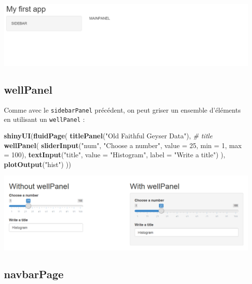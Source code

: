 \documentclass[
]{article}
\newenvironment{Shaded}{\begin{snugshade}}{\end{snugshade}}
\newcommand{\AttributeTok}[1]{\textcolor[rgb]{0.13,0.29,0.53}{#1}}
\newcommand{\CommentTok}[1]{\textcolor[rgb]{0.56,0.35,0.01}{\textit{#1}}}
\newcommand{\DecValTok}[1]{\textcolor[rgb]{0.00,0.00,0.81}{#1}}
\newcommand{\FunctionTok}[1]{\textcolor[rgb]{0.13,0.29,0.53}{\textbf{#1}}}
\newcommand{\NormalTok}[1]{#1}
\newcommand{\StringTok}[1]{\textcolor[rgb]{0.31,0.60,0.02}{#1}}
\begin{document}
\includegraphics{img/sidabar.png}

\hypertarget{wellpanel}{%
\subsection{wellPanel}\label{wellpanel}}

Comme avec le \texttt{sidebarPanel} précédent, on peut griser un
ensemble d'éléments en utilisant un \texttt{wellPanel} :

\begin{Shaded}
\begin{Highlighting}[]
\FunctionTok{shinyUI}\NormalTok{(}\FunctionTok{fluidPage}\NormalTok{(}
  \FunctionTok{titlePanel}\NormalTok{(}\StringTok{"Old Faithful Geyser Data"}\NormalTok{), }\CommentTok{\# title}
  \FunctionTok{wellPanel}\NormalTok{(}
    \FunctionTok{sliderInput}\NormalTok{(}\StringTok{"num"}\NormalTok{, }\StringTok{"Choose a number"}\NormalTok{, }\AttributeTok{value =} \DecValTok{25}\NormalTok{, }\AttributeTok{min =} \DecValTok{1}\NormalTok{, }\AttributeTok{max =} \DecValTok{100}\NormalTok{),  }
    \FunctionTok{textInput}\NormalTok{(}\StringTok{"title"}\NormalTok{, }\AttributeTok{value =} \StringTok{"Histogram"}\NormalTok{, }\AttributeTok{label =} \StringTok{"Write a title"}\NormalTok{)}
\NormalTok{  ),}
  \FunctionTok{plotOutput}\NormalTok{(}\StringTok{"hist"}\NormalTok{)}
\NormalTok{))}
\end{Highlighting}
\end{Shaded}

\includegraphics{img/wellPanel.png}

\hypertarget{navbarpage}{%
\subsection{navbarPage}\label{navbarpage}}
\end{document}
